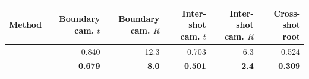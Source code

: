 \begin{tabular}{lrrrrr}
\toprule
Method & Boundary cam. $t$ & Boundary cam. $R$ & Inter-shot cam. $t$ & Inter-shot cam. $R$ & Cross-shot root \\
\midrule
\humanthree{} & 0.840 & 12.3 & 0.703 & 6.3 & 0.524 \\
\method{} & \textbf{0.679} & \textbf{8.0} & \textbf{0.501} & \textbf{2.4} & \textbf{0.309} \\
\bottomrule
\end{tabular}
